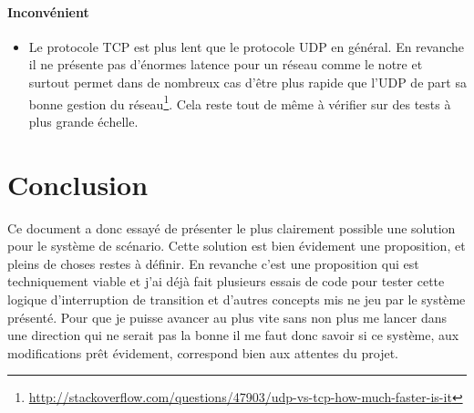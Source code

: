 \paragraph{Inconvénient}
\begin{itemize}
\item Le protocole TCP est plus lent que le protocole UDP en général. En revanche il ne présente pas d'énormes latence pour un réseau comme le notre et surtout permet dans de nombreux cas d'être plus rapide que l'UDP de part sa bonne gestion du réseau\footnote{\url{http://stackoverflow.com/questions/47903/udp-vs-tcp-how-much-faster-is-it}}. Cela reste tout de même à vérifier sur des tests à plus grande échelle.
\end{itemize}


\section{Conclusion}
Ce document a donc essayé de présenter le plus clairement possible une solution pour le système de scénario. Cette solution est bien évidement une proposition, et pleins de choses restes à définir. En revanche c'est une proposition qui est techniquement viable et j'ai déjà fait plusieurs essais de code pour tester cette logique d'interruption de transition et d'autres concepts mis ne jeu par le système présenté.\p
Pour que je puisse avancer au plus vite sans non plus me lancer dans une direction qui ne serait pas la bonne il me faut donc savoir si ce système, aux modifications prêt évidement, correspond bien aux attentes du projet.



   
   



